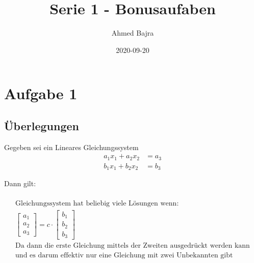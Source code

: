 \documentclass{article}
\title{Serie 1 - Bonusaufaben}
\author{Ahmed Bajra}
\date{2020-09-20}
\begin{document}
    \maketitle

    \section{Aufgabe 1}
    \subsection{Überlegungen}

    Gegeben sei ein Lineares Gleichungssystem
    \begin{align*}
        a_1 x_1 + a_2 x_2& = a_3 \\
        b_1 x_1 + b_2 x_2& = b_3
    \end{align*}

    Dann gilt: 

    \begin{equation}
        \begin{gathered}
            \\
            \text{Gleichungssystem hat beliebig viele Lösungen wenn: } \\
            \begin{bmatrix}
                a_1 \\
                a_2 \\
                a_3
            \end{bmatrix}
            = c \cdot
            \begin{bmatrix}
                b_1 \\
                b_2 \\
                b_3
            \end{bmatrix} \\
            \text{Da dann die erste Gleichung mittels der Zweiten ausgedrückt werden kann}\\
            \text{und es darum effektiv nur eine Gleichung mit zwei Unbekannten gibt}
            \\
        \end{gathered}
    \end{equation}
\end{document}

